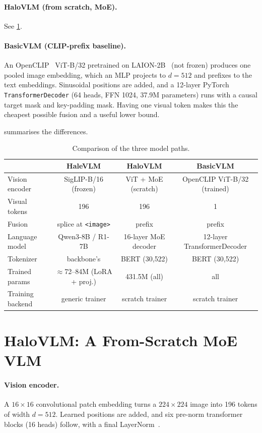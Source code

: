 \documentclass[11pt]{article}
\newcommand{\tok}[1]{\texttt{<#1>}}
\begin{document}
\paragraph{HaloVLM (from scratch, MoE).} See \cref{sec:halo}.

\paragraph{BasicVLM (CLIP-prefix baseline).} An OpenCLIP~\cite{cherti2023openclip} ViT-B/32
pretrained on LAION-2B~\cite{schuhmann2022laion5b} (not frozen) produces one pooled image
embedding, which an MLP projects to $d=512$ and prefixes to the text embeddings. Sinusoidal
positions are added, and a 12-layer PyTorch \texttt{TransformerDecoder} (64 heads, FFN 1024,
37.9M parameters) runs with a causal target mask and key-padding mask. Having one visual
token makes this the cheapest possible fusion and a useful lower bound.

 summarises the differences.

\begin{table}[t]
\centering
\caption{Comparison of the three model paths.}
\label{tab:compare}
\small
\begin{tabular}{lccc}
\toprule
 & HaleVLM & HaloVLM & BasicVLM \\
\midrule
Vision encoder & SigLIP-B/16 (frozen) & ViT + MoE (scratch) & OpenCLIP ViT-B/32 (trained) \\
Visual tokens & 196 & 196 & 1 \\
Fusion & splice at \tok{image} & prefix & prefix \\
Language model & Qwen3-8B / R1-7B & 16-layer MoE decoder & 12-layer TransformerDecoder \\
Tokenizer & backbone's & BERT (30{,}522) & BERT (30{,}522) \\
Trained params & $\approx$72--84M (LoRA + proj.) & 431.5M (all) & all \\
Training backend & generic trainer & scratch trainer & scratch trainer \\
\bottomrule
\end{tabular}
\end{table}

\section{HaloVLM: A From-Scratch MoE VLM}
\label{sec:halo}

\paragraph{Vision encoder.} A $16\times16$ convolutional patch embedding turns a $224\times224$
image into 196 tokens of width $d=512$. Learned positions are added, and six pre-norm
transformer blocks (16 heads) follow, with a final LayerNorm~\cite{dosovitskiy2021vit}.
\end{document}
